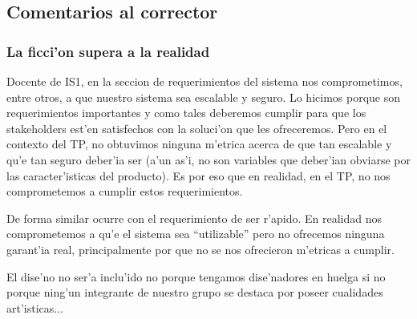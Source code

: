 \subsection{Comentarios al corrector}
\subsubsection{La ficci'on supera a la realidad}
Docente de IS1, en la seccion de requerimientos del sistema nos comprometimos, entre otros, a que nuestro sistema sea escalable y seguro. Lo hicimos porque son requerimientos importantes y como tales deberemos cumplir para que los stakeholders est'en satisfechos con la soluci'on que les ofreceremos. Pero en el contexto del TP, no obtuvimos ninguna m'etrica acerca de que tan escalable y qu'e tan seguro deber'ia ser (a'un as'i, no son variables que deber'ian obviarse por las caracter'isticas del producto). Es por eso que en realidad, en el TP, no nos comprometemos a cumplir estos requerimientos. 

De forma similar ocurre con el requerimiento de ser r'apido. En realidad nos comprometemos a qu'e el sistema sea ``utilizable'' pero no ofrecemos ninguna garant'ia real, principalmente por que no se nos ofrecieron m'etricas a cumplir.

El dise'no no ser'a inclu'ido no porque tengamos dise'nadores en huelga si no porque ning'un integrante de nuestro grupo se destaca por poseer cualidades art'isticas...


